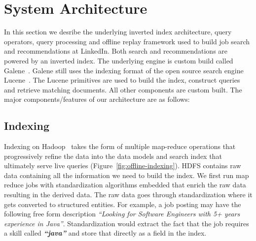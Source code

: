 \section{System Architecture} \label{sec:system-architecture}

In this section we desribe the underlying inverted index architecture, query
operators, query processing and offline replay framework used to build job
search and recommendations at LinkedIn. Both search and recommendations are
powered by an inverted index. The underlying engine is custom build called
Galene~\cite{sriram2014}. Galene still uses the indexing format of the open
source search engine Lucene~\cite{mccandless2010lucene}. The Lucene primitives
are used to build the index, construct queries and retrieve matching documents.
All other components are custom built. The major components/features of our
architecture are as follows:

\subsection{Indexing}
Indexing on Hadoop~\cite{white2012hadoop} takes the form of multiple map-reduce operations that progressively refine the data into the data models 
and search index that ultimately serve live queries (Figure~\ref{fig:offline-indexing}).  
HDFS contains raw data containing all the information we need to build the index.  
We first run map reduce jobs with standardization algorithms embedded that enrich the raw data resulting in the derived data.  
The raw data goes through standardization where it gets converted to structured
entities. For example, a job posting may have the following free form
description {\it ``Looking for Software Engineers with 5+ years experience in
Java''}. Standardization would extract the fact that the job requires a skill
called {\it \bf ``java''} and store that directly as a field in the index. 

